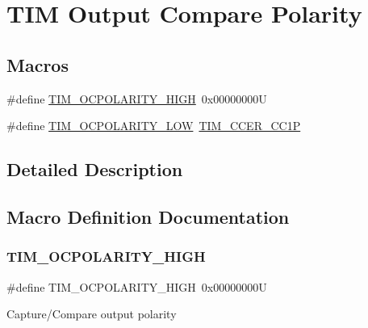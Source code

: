 \hypertarget{group___t_i_m___output___compare___polarity}{}\section{T\+IM Output Compare Polarity}
\label{group___t_i_m___output___compare___polarity}
\subsection*{Macros}
\begin{DoxyCompactItemize}
\item 
\#define \mbox{\hyperlink{group___t_i_m___output___compare___polarity_ga5887380660b742f0045e9695914231b8}{T\+I\+M\+\_\+\+O\+C\+P\+O\+L\+A\+R\+I\+T\+Y\+\_\+\+H\+I\+GH}}~0x00000000U
\item 
\#define \mbox{\hyperlink{group___t_i_m___output___compare___polarity_ga1daff1574b0a2d17ccc9ae40a649ac37}{T\+I\+M\+\_\+\+O\+C\+P\+O\+L\+A\+R\+I\+T\+Y\+\_\+\+L\+OW}}~\mbox{\hyperlink{group___peripheral___registers___bits___definition_ga0ca0aedba14241caff739afb3c3ee291}{T\+I\+M\+\_\+\+C\+C\+E\+R\+\_\+\+C\+C1P}}
\end{DoxyCompactItemize}


\subsection{Detailed Description}


\subsection{Macro Definition Documentation}
\mbox{\label{group___t_i_m___output___compare___polarity_ga5887380660b742f0045e9695914231b8}} 
\subsubsection{\texorpdfstring{TIM\_OCPOLARITY\_HIGH}{TIM\_OCPOLARITY\_HIGH}}
{\footnotesize\ttfamily \#define T\+I\+M\+\_\+\+O\+C\+P\+O\+L\+A\+R\+I\+T\+Y\+\_\+\+H\+I\+GH~0x00000000U}

Capture/\+Compare output polarity \mbox{\label{group___t_i_m___output___compare___polarity_ga1daff1574b0a2d17ccc9ae40a649ac37}} 
